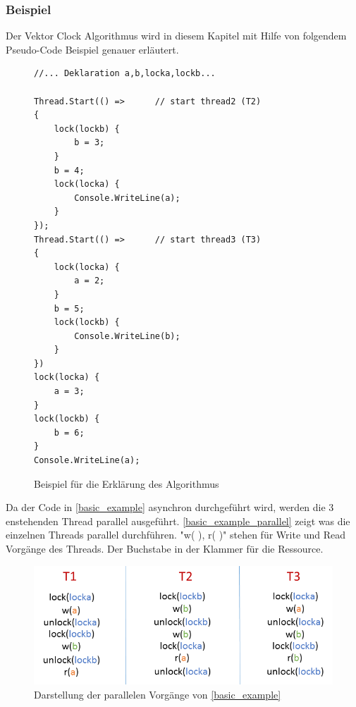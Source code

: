 \documentclass[10pt,a4paper]{article}
\begin{document}
\subsubsection{Beispiel}\label{example}
\begin{flushleft}
Der Vektor Clock Algorithmus wird in diesem Kapitel mit Hilfe von folgendem Pseudo-Code Beispiel genauer erläutert.\\
\begin{figure}[H]
\begin{singlespace}
\begin{lstlisting}[basicstyle=\small]
//... Deklaration a,b,locka,lockb...

Thread.Start(() =>		// start thread2 (T2)
{
	lock(lockb) {
		b = 3;
	}
	b = 4;
	lock(locka) {
		Console.WriteLine(a);
	}
});
Thread.Start(() =>		// start thread3 (T3)
{
	lock(locka) {
		a = 2;
	}
	b = 5;
	lock(lockb) {
		Console.WriteLine(b);
	}
})
lock(locka) {
	a = 3;
}
lock(lockb) {
	b = 6;
}
Console.WriteLine(a);
\end{lstlisting}
\end{singlespace}
\caption{Beispiel für die Erklärung des Algorithmus}\label{basic_example}
\end{figure}
Da der Code in \autoref{basic_example} asynchron durchgeführt wird, werden die 3 enstehenden Thread parallel ausgeführt. \autoref{basic_example_parallel} zeigt was die einzelnen Threads parallel durchführen. "w( ), r( )" stehen für Write und Read Vorgänge des Threads. Der Buchstabe in der Klammer für die Ressource.
\begin{figure}[H]
\centering
\includegraphics[scale=0.5]{images/VectorCheckingAlgorithm.png}
\caption{Darstellung der parallelen Vorgänge von \autoref{basic_example}}
\label{basic_example_parallel}
\end{figure}
\end{flushleft}
\newpage
\end{document}
